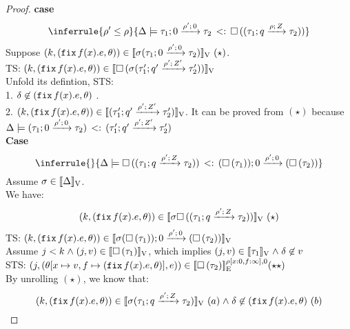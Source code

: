 \begin{proof}

\textbf{case}
\[
 \inferrule{
\dmap' \leq \dmap
    }{
       \Delta \models \sub{\tarr{\type_1}{\type_2}{0}{\dmap'}{0} }{  \tbox{(
          \tarr{\type_1}{\type_2}{\nnatbiA}{\dmap}{\nnatA} )  }
    } }
\]
Suppose  $ (\stepiA, (\efix f(x).\expr, \env) ) \in \lrv{\ienv (\tarr{\type_1}{\type_2}{0}{\dmap'}{0})  } ~(\star)$.\\
TS: $ (\stepiA, (\efix f(x).\expr, \env) ) \in \lrv{ \tbox{\ienv (\tarr{\type_1'}{\type_2'}{\nnatbiA'}{\dmap'}{\nnatA'})  } } $ \\
Unfold its defintion, STS:\\
1. $ \delta \not \in  (\efix f(x).\expr, \env)$ .  \\
2.  $(\stepiA, (\efix f(x).\expr, \env) ) \in  \lrv{(\tarr{\type_1'}{\type_2'}{\nnatbiA'}{\dmap'}{\nnatA'})}
$.  It can be proved from $(\star)$ because $ \Delta \models \sub{ (\tarr{\type_1}{\type_2}{0}{\dmap'}{0})} { (\tarr{\type_1'}{\type_2'}{\nnatbiA'}{\dmap'}{\nnatA'}) }  $ \\



\textbf{Case}
\[
\inferrule{
    }{
       \Delta \models \sub{\tbox{(
          \tarr{\type_1}{\type_2}{\nnatbiA}{\dmap'}{\nnatA} )} 
      }{\tarr{(\tbox{\type_1}) }{(\tbox{\type_2})}{0}{\dmap'}{0} }
    }
\]
Assume $ \ienv \in \lrv{\Delta}$.\\
We have:  $$ (\stepiA, (\efix f(x).\expr, \env) ) \in \lrv{\ienv \tbox{(
          \tarr{\type_1}{\type_2}{\nnatbiA}{\dmap'}{\nnatA} )} }
      ~(\star)$$
TS: $ (\stepiA, (\efix f(x).\expr, \env) ) \in \lrv{ \ienv 
  \tarr{(\tbox{\type_1}) }{(\tbox{\type_2})}{0}{\dmap'}{0}} $ \\
Assume $\stepiB < \stepiA \conj (j, \valr) \in \lrv{\tbox{\type_1}}$,
which implies $ (j, \valr) \in \lrv{\type_1} \conj \delta \not \in \valr$ \\
STS: $(\stepiB, (\env[x \mapsto \valr, f \mapsto (\efix f(x).\expr,
\env)], \expr)) \in \lre{\dmap[x: 0, f:
  \infty]}{0}{ \tbox{ \type_2} } (\star\star)$\\

By unrolling $(\star)$, we know that: 
 $$ (\stepiA, (\efix f(x).\expr, \env) ) \in \lrv{\ienv (
          \tarr{\type_1}{\type_2}{\nnatbiA}{\dmap'}{\nnatA} ) } ~(a) \conj
        \delta \not \in   (\efix f(x).\expr, \env) ~(b)
      $$


\end{proof}
